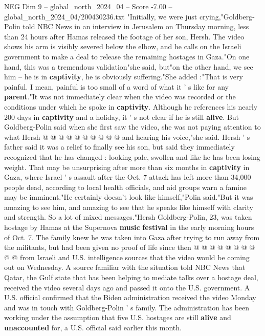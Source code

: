\begin{textsample}{NEG Dim 9 – global\_north\_2024\_04 – Score -7.00 – global\_north\_2024\_04/200430236.txt}  \label{ex:f9_neg_268}
"Initially, we were just crying,"Goldberg-Polin told NBC News in an interview in Jerusalem on Thursday morning, less than 24 hours after Hamas released the footage of her son, Hersh.
The video shows his arm is visibly severed below the elbow, and he calls on the Israeli government to make a deal to release the remaining hostages in Gaza."On one hand, this was a tremendous validation"she said, but"on the other hand, we see him -- he is in \textbf{captivity}, he is obviously suffering."She added :"That is very painful.
I mean, painful is too small of a word of what it ' s like for any \textbf{parent}."It was not immediately clear when the video was recorded or the conditions under which he spoke in \textbf{captivity}.
Although he references his nearly 200 days in \textbf{captivity} and a holiday, it ' s not clear if he is still \textbf{alive}.
But Goldberg-Polin said when she first saw the video, she was not paying attention to what Hersh @ @ @ @ @ @ @ @ @ @ and hearing his voice,"she said.
Hersh ' s father said it was a relief to finally see his son, but said they immediately recognized that he has changed : looking pale, swollen and like he has been losing weight.
That may be unsurprising after more than six months in \textbf{captivity} in Gaza, where Israel ' s assault after the Oct. 7 attack has left more than 34,000 people dead, according to local health officials, and aid groups warn a famine may be imminent."He certainly doesn't look like himself,"Polin said."But it was amazing to see him, and amazing to see that he speaks like himself with clarity and strength.
So a lot of mixed messages."Hersh Goldberg-Polin, 23, was taken hostage by Hamas at the Supernova \textbf{music} \textbf{festival} in the early morning hours of Oct. 7.
The family knew he was taken into Gaza after trying to run away from the militants, but had been given no proof of life since then @ @ @ @ @ @ @ @ @ @ from Israeli and U.S. intelligence sources that the video would be coming out on Wednesday.
A source familiar with the situation told NBC News that Qatar, the Gulf state that has been helping to mediate talks over a hostage deal, received the video several days ago and passed it onto the U.S. government.
A U.S. official confirmed that the Biden administration received the video Monday and was in touch with Goldberg-Polin ' s family.
The administration has been working under the assumption that five U.S. hostages are still \textbf{alive} and \textbf{unaccounted} for, a U.S. official said earlier this month.

\end{textsample}

